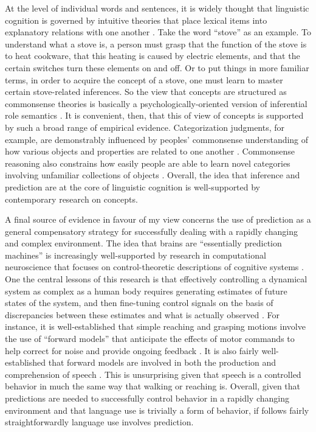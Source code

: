 At the level of individual words and sentences, it is widely thought that linguistic cognition is governed by intuitive theories that place lexical items into explanatory relations with one another \citep{Murphy:1985,MargolisLaurence:1999}. Take the word ``stove'' as an example. To understand what a stove is, a person must grasp that the function of the stove is to heat cookware, that this heating is caused by electric elements, and that the certain switches turn these elements on and off. Or to put things in more familiar terms, in order to acquire the concept of a stove, one must learn to master certain stove-related inferences. So the view that concepts are structured as commonsense theories is basically a psychologically-oriented version of  inferential role semantics \citep{Fodor:1998}. It is convenient, then, that this of view of concepts is supported by such a broad range of empirical evidence. Categorization judgments, for example, are demonstrably influenced by peoples' commonsense understanding of how various objects and properties are related to one another \citep{LinMurphy:1997, Murphy:1985}. Commonsense reasoning also constrains how easily people are able to learn novel categories involving unfamiliar collections of objects \citep{Murphy:1985}. Overall, the idea that inference and prediction are at the core of linguistic cognition is well-supported by contemporary research on concepts. 

A final source of evidence in favour of my view concerns the use of prediction as a general compensatory strategy for successfully dealing with a rapidly changing and complex environment. The idea that brains are ``essentially prediction machines'' \citep[][p. 181]{clark:2013} is increasingly well-supported by research in computational neuroscience that focuses on control-theoretic descriptions of cognitive systems \citep{Eliasmith:2013,Grush:2004,Eliasmith:2010,EliasmithAnderson:2003}. One the central lessons of this research is that effectively controlling a dynamical system as complex as a human body requires generating estimates of future states of the system, and then fine-tuning control signals on the basis of discrepancies between these estimates and what is actually observed \citep{Grush:2004,Pickering:2013,Pickering:2007}. For instance, it is well-established that simple reaching and grasping motions involve the use of ``forward models'' that anticipate the effects of motor commands to help correct for noise and provide ongoing feedback \citep{Pickering:2013,Pickering:2007}. It is also fairly well-established that forward models are involved in both the production and comprehension of speech \citep{Pickering:2013,Pickering:2007}. This is unsurprising given that speech is a controlled behavior in much the same way that walking or reaching is. Overall, given that predictions are needed to successfully control behavior in a rapidly changing environment and that language use is trivially a form of behavior, if follows fairly straightforwardly language use involves prediction. 

